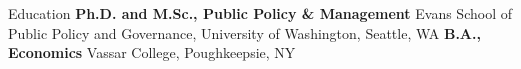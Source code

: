 \begin{rubric}{Education}
\entry*[2016 - 2021]%
    \textbf{Ph.D. and M.Sc., Public Policy \& Management} Evans School of Public Policy and Governance, University of Washington, Seattle, WA
\entry*[2012 - 2016]%
    \textbf{B.A., Economics} Vassar College, Poughkeepsie, NY
\end{rubric}
